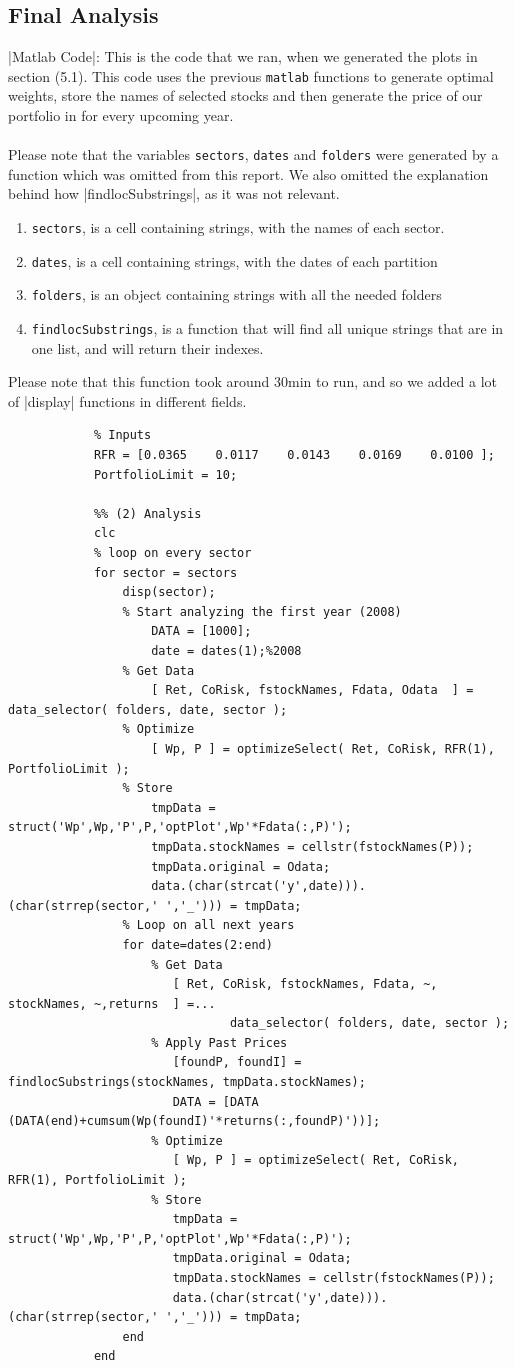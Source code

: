 \documentclass[12pt,titlepage,letter]{article}
\begin{document}
	\subsection{Final Analysis}
		|Matlab Code|: This is the code that we ran, when we generated the plots in section (5.1). This code uses the previous \verb|matlab| functions to generate optimal weights, store the names of selected stocks and then generate the price of our portfolio in for every upcoming year.\\
		\\
		Please note that the variables \verb|sectors|, \verb|dates| and \verb|folders| were generated by a function which was omitted from this report. We also omitted the explanation behind how |findlocSubstrings|, as it was not relevant.\\
		\begin{enumerate}
			\item \verb|sectors|, is a cell containing strings, with the names of each sector.
			\item \verb|dates|, is a cell containing strings, with the dates of each partition
			\item \verb|folders|, is an object containing strings with all the needed folders
			\item \verb|findlocSubstrings|, is a function that will find all unique strings that are in one list, and will return their indexes. 
		\end{enumerate}
		Please note that this function took around 30min to run, and so we added a lot of |display| functions in different fields.
		\begin{verbatim}
			% Inputs
			RFR = [0.0365    0.0117    0.0143    0.0169    0.0100 ];
			PortfolioLimit = 10;

			%% (2) Analysis
			clc
			% loop on every sector
			for sector = sectors
			    disp(sector);
			    % Start analyzing the first year (2008)
				    DATA = [1000];
				    date = dates(1);%2008
			    % Get Data
				    [ Ret, CoRisk, fstockNames, Fdata, Odata  ] = data_selector( folders, date, sector );
			    % Optimize
				    [ Wp, P ] = optimizeSelect( Ret, CoRisk, RFR(1), PortfolioLimit );
			    % Store
				    tmpData = struct('Wp',Wp,'P',P,'optPlot',Wp'*Fdata(:,P)');
				    tmpData.stockNames = cellstr(fstockNames(P));
				    tmpData.original = Odata;
				    data.(char(strcat('y',date))).(char(strrep(sector,' ','_'))) = tmpData;
			    % Loop on all next years
			    for date=dates(2:end)
			        % Get Data
			           [ Ret, CoRisk, fstockNames, Fdata, ~, stockNames, ~,returns  ] =...
			           	       data_selector( folders, date, sector );
			        % Apply Past Prices
			           [foundP, foundI] = findlocSubstrings(stockNames, tmpData.stockNames);
			           DATA = [DATA (DATA(end)+cumsum(Wp(foundI)'*returns(:,foundP)'))];
			        % Optimize
			           [ Wp, P ] = optimizeSelect( Ret, CoRisk, RFR(1), PortfolioLimit );
			        % Store
			           tmpData = struct('Wp',Wp,'P',P,'optPlot',Wp'*Fdata(:,P)');
				       tmpData.original = Odata;
				       tmpData.stockNames = cellstr(fstockNames(P));
				       data.(char(strcat('y',date))).(char(strrep(sector,' ','_'))) = tmpData;
			    end
			end
		\end{verbatim}
\end{document}
